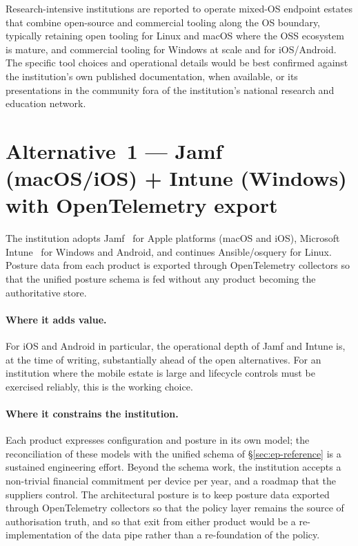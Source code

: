 \begin{realworldbox}
\noindent Research-intensive institutions are reported to operate
mixed-OS endpoint estates that combine open-source and commercial
tooling along the OS boundary, typically retaining open tooling for
Linux and macOS where the OSS ecosystem is mature, and commercial
tooling for Windows at scale and for iOS/Android. The specific tool
choices and operational details would be best confirmed against
the institution's own published documentation, when available, or
its presentations in the community fora of the institution's
national research and education network.
\end{realworldbox}

\section{Alternative~1 --- Jamf (macOS/iOS) + Intune (Windows) with OpenTelemetry export}
\label{sec:ep-alt1}

\begin{alternativebox}
\noindent The institution adopts Jamf~\cite{jamf} for Apple platforms
(macOS and iOS), Microsoft Intune~\cite{intune} for Windows and
Android, and continues Ansible/osquery for Linux. Posture data from each product is
exported through OpenTelemetry collectors so that the unified
posture schema is fed without any product becoming the
authoritative store.
\end{alternativebox}

\paragraph{Where it adds value.} For iOS and Android in particular,
the operational depth of Jamf and Intune is, at the time of
writing, substantially ahead of the open alternatives. For an
institution where the mobile estate is large and lifecycle controls
must be exercised reliably, this is the working choice.

\paragraph{Where it constrains the institution.} Each product
expresses configuration and posture in its own model; the
reconciliation of these models with the unified schema of
\S\ref{sec:ep-reference} is a sustained engineering effort. Beyond
the schema work, the institution accepts a non-trivial financial
commitment per device per year, and a roadmap that the suppliers
control. The architectural posture is to keep posture data
exported through OpenTelemetry collectors so that the policy layer
remains the source of authorisation truth, and so that exit from
either product would be a re-implementation of the data pipe rather
than a re-foundation of the policy.

